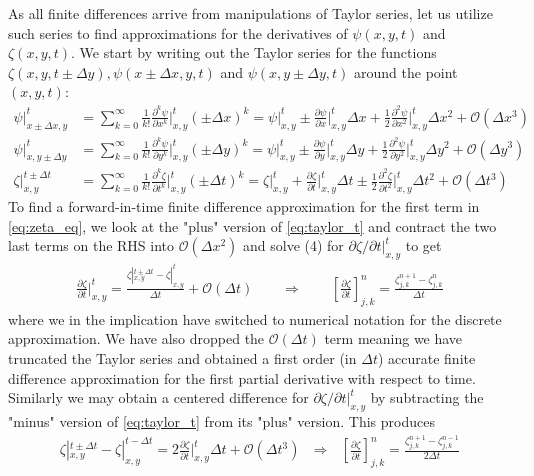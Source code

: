 \documentclass[12pt]{article}
\numberwithin{figure}{section}
\numberwithin{table}{section}
\newcommand{\dydx}{\frac{\partial\psi}{\partial x}}
\newcommand{\dydy}{\frac{\partial\psi}{\partial y}}
\newcommand{\dyydxx}{\frac{\partial^2\psi}{\partial x^2}}
\newcommand{\dyydyy}{\frac{\partial^2\psi}{\partial y^2}}
\newcommand{\dydt}{\frac{\partial\zeta}{\partial t}}
\newcommand{\dyydtt}{\frac{\partial^2\zeta}{\partial t^2}}
\newcommand{\Ixyt}{|_{x,y}^{t}}
\newcommand{\IIxyt}{\Bigr|_{x,y}^{t}}
\newcommand{\Ixytp}{|_{x,y}^{t\pm\Delta t}}
\newcommand{\Ixytm}{|_{x,y}^{t-\Delta t}}
\newcommand{\Ixpyt}{|_{x\pm\Delta x,y}^{t}}
\newcommand{\Ixypt}{|_{x,y\pm\Delta y}^{t}}
\begin{document}
\noindent As all finite differences arrive from manipulations of Taylor series, let us utilize such series to find approximations for the derivatives of $\psi(x,y,t)$ and $\zeta(x,y,t)$. We start by writing out the Taylor series for the functions $\zeta(x,y,t\pm\Delta y),\psi(x\pm\Delta x,y,t)$ and $\psi(x,y\pm\Delta y,t)$ around the point$(x,y,t)$:
\begin{align}
	\psi\Ixpyt&=\sum_{k=0}^{\infty}\frac{1}{k!}\frac{\partial^k\psi}{\partial x^k}\IIxyt(\pm\Delta x)^k=\psi\Ixyt\pm\dydx\IIxyt\Delta x+\frac{1}{2}\dyydxx\IIxyt\Delta x^2+\mathcal{O}(\Delta x^3) \label{eq:taylor_x}\\[0.2cm]
    \psi\Ixypt&=\sum_{k=0}^{\infty}\frac{1}{k!}\frac{\partial^k\psi}{\partial y^k}\IIxyt(\pm\Delta y)^k=\psi\Ixyt\pm\dydy\IIxyt\Delta y+\frac{1}{2}\dyydyy\IIxyt\Delta y^2+\mathcal{O}(\Delta y^3) \label{eq:taylor_y}\\[0.2cm]
	\zeta\Ixytp&=\sum_{k=0}^{\infty}\frac{1}{k!}\frac{\partial^k\zeta}{\partial t^k}\IIxyt(\pm\Delta t)^k=\zeta\Ixyt+\dydt\IIxyt\Delta t\pm\frac{1}{2}\dyydtt\IIxyt\Delta t^2+\mathcal{O}(\Delta t^3) \label{eq:taylor_t}
\end{align}
To find a forward-in-time finite difference approximation for the first term in \eqref{eq:zeta_eq}, we look at the "plus" version of \eqref{eq:taylor_t} and contract the two last terms on the RHS into $\mathcal{O}(\Delta x^2)$ and solve (4) for $\partial\zeta/\partial t\Ixyt$ to get
\begin{align}
	\dydt\IIxyt=\frac{\zeta\Ixytp-\zeta\Ixyt}{\Delta t}+\mathcal{O}(\Delta t)\qquad\Rightarrow\qquad\left[\dydt\right]_{j,k}^n=\frac{\zeta_{j,k}^{n+1}-\zeta_{j,k}^n}{\Delta t} \label{eq:forward_euler_fda}
\end{align}
where we in the implication have switched to numerical notation for the discrete approximation. We have also dropped the $\mathcal{O}(\Delta t)$ term meaning we have truncated the Taylor series and obtained a first order (in $\Delta t$) accurate finite difference approximation for the first partial derivative with respect to time. Similarly we may obtain a centered difference for $\partial\zeta/\partial t\Ixyt$ by subtracting the "minus" version of \eqref{eq:taylor_t} from its "plus" version. This produces
\begin{align}
	\zeta\Ixytp-\zeta\Ixytm=2\dydt\Ixyt\Delta t+\mathcal{O}(\Delta t^3)\ \ \ \Rightarrow \ \ \ \left[\dydt\right]_{j,k}^n=\frac{\zeta_{j,k}^{n+1}-\zeta_{j,k}^{n-1}}{2\Delta t} \label{eq:leapfrog_t_fda}
\end{align}
\end{document}

